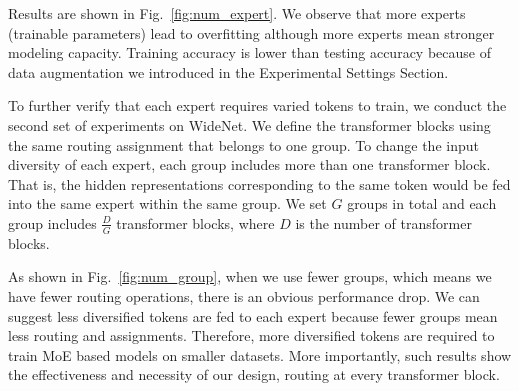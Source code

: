 \documentclass[letterpaper]{article} %
\begin{document}








Results are shown in Fig.~\ref{fig:num_expert}. We observe that more experts (trainable parameters) lead to overfitting although more experts mean stronger modeling capacity. Training accuracy is lower than testing accuracy because of data augmentation we introduced in the Experimental Settings Section.



To further verify that each expert requires varied tokens to train, we conduct the second set of experiments on WideNet. We define the transformer blocks using the same routing assignment that belongs to one group. To change the input diversity of each expert, each group includes more than one transformer block. That is, the hidden representations corresponding to the same token would be fed into the same expert within the same group. We set $G$ groups in total and each group includes $\frac{D}{G}$ transformer blocks, where $D$ is the number of transformer blocks.  

As shown in Fig.~\ref{fig:num_group}, when we use fewer groups, which means we have fewer routing operations, there is an obvious performance drop. We can suggest less diversified tokens are fed to each expert because fewer groups mean less routing and assignments. Therefore, more diversified tokens are required to train MoE based models on smaller datasets. More importantly, such results show the effectiveness and necessity of our design, routing at every transformer block.
\end{document}

